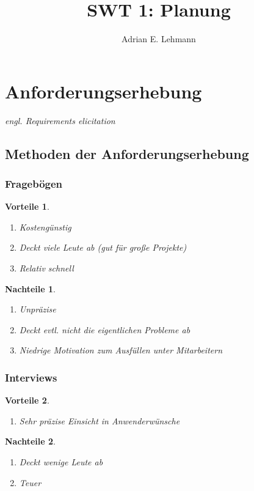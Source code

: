 \documentclass[a4paper]{article}
\title{SWT 1: Planung}
\author{Adrian E. Lehmann}
\theoremstyle{break}
\newtheorem{why}{Vorteile}[section]
\newtheorem{whynot}{Nachteile}[section]
\begin{document}
	\maketitle
	\tableofcontents
	\newpage

	
\section{Anforderungserhebung}
	\textit{engl. Requirements elicitation}
\subsection{Methoden der Anforderungserhebung}	
\subsubsection{Fragebögen}
	\begin{why}
		\begin{enumerate}
			\item Kostengünstig
			\item Deckt viele Leute ab (gut für große Projekte)
			\item Relativ schnell
		\end{enumerate}
	\end{why}
	\begin{whynot}
		\begin{enumerate}
			\item Unpräzise
			\item Deckt evtl. nicht die eigentlichen Probleme ab
			\item Niedrige Motivation zum Ausfüllen unter Mitarbeitern
		\end{enumerate}
	\end{whynot}
\subsubsection{Interviews}
	\begin{why}
		\begin{enumerate}
			\item Sehr präzise Einsicht in Anwenderwünsche
		\end{enumerate}
	\end{why}
	\begin{whynot}
		\begin{enumerate}
			\item Deckt wenige Leute ab
			\item Teuer
			\end{enumerate}
	\end{whynot}
\end{document}
